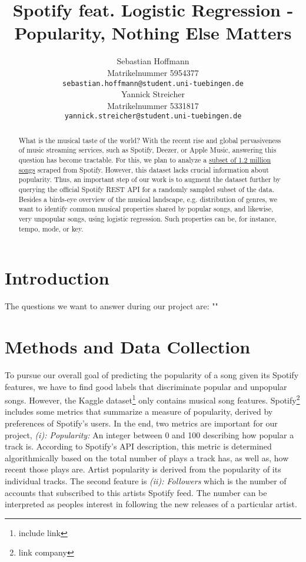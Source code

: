 \documentclass{article}
\title{Spotify feat. Logistic Regression - \\ Popularity, Nothing Else Matters}
\author{%
  Sebastian Hoffmann\\
  Matrikelnummer 5954377\\
  \texttt{sebastian.hoffmann@student.uni-tuebingen.de} \\
  \And
  Yannick Streicher\\
  Matrikelnummer 5331817\\
  \texttt{yannick.streicher@student.uni-tuebingen.de} \\
}
\begin{document}
\maketitle

\begin{abstract}
  What is the musical taste of the world? With the recent rise and global pervasiveness of music streaming services, such as Spotify, Deezer, or Apple Music, answering this question has become tractable. For this, we plan to analyze a \href{https://www.kaggle.com/rodolfofigueroa/spotify-12m-songs}{subset of 1.2 million songs} scraped from Spotify. However, this dataset lacks crucial information about popularity. Thus, an important step of our work is to augment the dataset further by querying the official Spotify REST API for a randomly sampled subset of the data. Besides a birds-eye overview of the musical landscape, e.g. distribution of genres, we want to identify common musical properties shared by popular songs, and likewise, very unpopular songs, using logistic regression. Such properties can be, for instance, tempo, mode, or key.
\end{abstract}

\section{Introduction}
The questions we want to answer during our project are: ""

\section{Methods and Data Collection}
To pursue our overall goal of predicting the popularity of a song given its Spotify features, we have to find good labels that discriminate popular and unpopular songs. 
However, the Kaggle dataset\footnote{include link} only contains musical song features. 
Spotify\footnote{link company} includes some metrics that summarize a measure of popularity, derived by preferences of Spotify's users. 
In the end, two metrics are important for our project, \textit{(i): Popularity:} An integer between 0 and 100 describing how popular a track is. 
According to Spotify's API description, this metric is determined algorithmically based on the total number of plays a track has, as well as, how recent those plays are. 
Artist popularity is derived from the popularity of its individual tracks. 
The second feature is \textit{(ii): Followers} which is the number of accounts that subscribed to this artists Spotify feed. 
The number can be interpreted as peoples interest in following the new releases of a particular artist.
\end{document}
